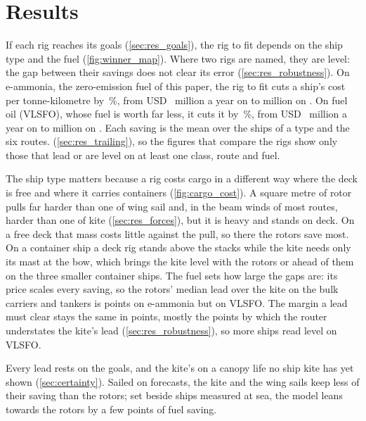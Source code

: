 \section{Results}
\label{sec:results}

If each rig reaches its goals (\cref{sec:res_goals}), the rig to fit depends on the ship type and the fuel (\cref{fig:winner_map}). \NumAdvice{} Where two rigs are named, they are level: the gap between their savings does not clear its error (\cref{sec:res_robustness}). On e-ammonia, the zero-emission fuel of this paper, the rig to fit cuts a ship's cost per tonne-kilometre by \NumAnswerSharesAmmonia\,\%, from USD~\NumAnswerMoneyLowAmmonia{} million a year on \NumAnswerMoneyLowShipsAmmonia{} to \NumAnswerMoneyHighAmmonia{} million on \NumAnswerMoneyHighShipsAmmonia{}. On fuel oil (VLSFO), whose fuel is worth far less, it cuts it by \NumAnswerSharesOil\,\%, from USD~\NumAnswerMoneyLowOil{} million a year on \NumAnswerMoneyLowShipsOil{} to \NumAnswerMoneyHighOil{} million on \NumAnswerMoneyHighShipsOil{}. Each saving is the mean over the ships of a type and the six routes. \NumTrailingSummary{} (\cref{sec:res_trailing}), so the figures that compare the rigs show only those that lead or are level on at least one class, route and fuel.

The ship type matters because a rig costs cargo in a different way where the deck is free and where it carries containers (\cref{fig:cargo_cost}). A square metre of rotor pulls far harder than one of wing sail and, in the beam winds of most routes, harder than one of kite (\cref{sec:res_forces}), but it is heavy and stands on deck. On a free deck that mass costs little against the pull, so there the rotors save most. On a container ship a deck rig stands above the stacks while the kite needs only its mast at the bow, which brings the kite level with the rotors or ahead of them on the three smaller container ships. The fuel sets how large the gaps are: its price scales every saving, so the rotors' median lead over the kite on the bulk carriers and tankers is \NumRotorLeadBulkTankerAmmonia{} points on e-ammonia but \NumRotorLeadBulkTankerOil{} on VLSFO. The margin a lead must clear stays the same in points, mostly the \NumKiteGapBias{} points by which the router understates the kite's lead (\cref{sec:res_robustness}), so more ships read level on VLSFO.

Every lead rests on the goals, and the kite's on a canopy life no ship kite has yet shown (\cref{sec:certainty}). Sailed on forecasts, the kite and the wing sails keep less of their saving than the rotors; set beside ships measured at sea, the model leans towards the rotors by a few points of fuel saving.

